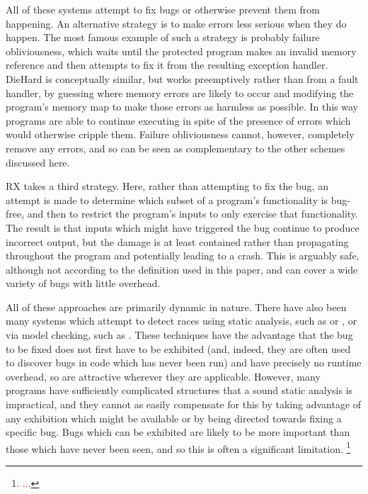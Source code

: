 \documentclass[10pt,twocolumn,preprint,natbib,authoryear]{sigplanconf}
\newcommand{\editorial}[1]{\textcolor{red}{\footnote{\textcolor{red}{#1}}}}
\begin{document}
All of these systems attempt to fix bugs or otherwise prevent them
from happening.  An alternative strategy is to make errors less
serious when they do happen.  The most famous example of such a
strategy is probably failure obliviousness\cite{Rinard2004}, which
waits until the protected program makes an invalid memory reference
and then attempts to fix it from the resulting exception handler.
DieHard\cite{Berger2006} is conceptually similar, but works
preemptively rather than from a fault handler, by guessing where
memory errors are likely to occur and modifying the program's memory
map to make those errors as harmless as possible.  In this way
programs are able to continue executing in spite of the presence of
errors which would otherwise cripple them.  Failure obliviousness
cannot, however, completely remove any errors, and so can be seen as
complementary to the other schemes discussed here.

RX\cite{Qin2007} takes a third strategy.  Here, rather than
attempting to fix the bug, an attempt is made to determine which
subset of a program's functionality is bug-free, and then to restrict
the program's inputs to only exercise that functionality.  The result
is that inputs which might have triggered the bug continue to produce
incorrect output, but the damage is at least contained rather than
propagating throughout the program and potentially leading to a crash.
This is arguably safe, although not according to the definition used
in this paper, and can cover a wide variety of bugs with little
overhead.

All of these approaches are primarily dynamic in nature.  There have
also been many systems which attempt to detect races using static
analysis, such as \cite{Pratikakis2006} or \cite{Engler2003}, or via
model checking, such as \cite{Elmas06preciserace}.  These techniques
have the advantage that the bug to be fixed does not first have to be
exhibited (and, indeed, they are often used to discover bugs in code
which has never been run) and have precisely no runtime overhead, so
are attractive wherever they are applicable.  However, many programs
have sufficiently complicated structures that a sound static analysis
is impractical, and they cannot as easily compensate for this by
taking advantage of any exhibition which might be available or by
being directed towards fixing a specific bug.  Bugs which can be
exhibited are likely to be more important than those which have never
been seen, and so this is often a significant
limitation. \editorial{...}
\end{document}
